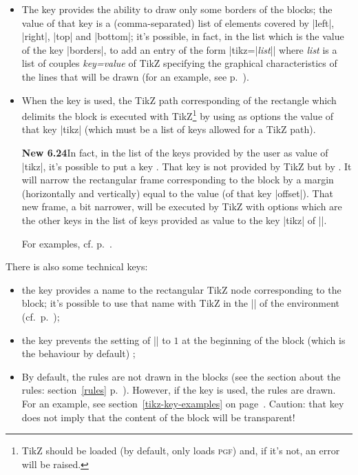 \documentclass[dvipsnames]{article}%
\begin{document}
\begin{itemize}
\item {}
The key  provides the ability to draw only some
borders of the blocks; the value of that key is a (comma-separated) list of
elements covered by |left|, |right|, |top| and |bottom|; it's possible, in
fact, in the list which is the value of the key |borders|, to add an entry of
the form |tikz={|\textsl{list}|}| where \textsl{list} is a list of couples
\textsl{key=value} of TikZ specifying the graphical characteristics of the
lines that will be drawn (for an example, see p.~\pageref{dashed}).

\item {}
When the key  is used, the TikZ path corresponding of
the rectangle which delimits the block is executed with TikZ\footnote{TikZ
should be loaded (by default,  only loads \textsc{pgf}) and,
if it's not, an error will be raised.} by using as options the value of that
key |tikz| (which must be a list of keys allowed for a TikZ path). 

\colorbox{yellow!50}{\textbf{New 6.24}}\enskip In fact, in the list of the keys
provided  by the user as value of |tikz|, it's possible to put a key
. That key is not provided by TikZ but by .
It will narrow the rectangular frame corresponding to the block by a margin
(horizontally and vertically) equal to the value (of that key |offset|). That
new frame, a bit narrower, will be executed by TikZ with options which are the
other keys in the list of keys provided as value to the key |tikz| of |\Block|.

For examples, cf. p.~\pageref{tikz-key-examples}.
\end{itemize}


\medskip
There is also some technical keys:

\begin{itemize}
\item {}
the key  provides a name to the rectangular TikZ node
corresponding to the block; it's possible to use that name with TikZ in the
|\CodeAfter| of the environment (cf.~p.~\pageref{code-after});
\item {}
the key  prevents the setting of
|\arraystretch| to $1$ at the beginning of the block (which is the behaviour
by default) ;
\item {}
By default, the rules are not drawn in the blocks (see the section about
the rules: section~\ref{rules} p.~\pageref{rules}). However, if the key
 is used, the rules are drawn. For an example, see
section~\ref{tikz-key-examples} on page~\pageref{tikz-key-examples}. Caution:
that key does not imply that the content of the block will be transparent!
\end{itemize}
\end{document}
